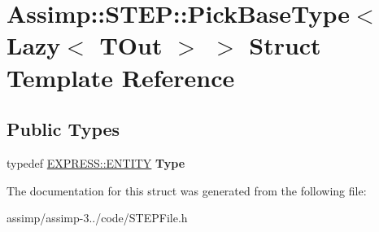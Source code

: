\hypertarget{struct_assimp_1_1_s_t_e_p_1_1_pick_base_type_3_01_lazy_3_01_t_out_01_4_01_4}{\section{Assimp\+:\+:S\+T\+E\+P\+:\+:Pick\+Base\+Type$<$ Lazy$<$ T\+Out $>$ $>$ Struct Template Reference}
\label{struct_assimp_1_1_s_t_e_p_1_1_pick_base_type_3_01_lazy_3_01_t_out_01_4_01_4}
}
\subsection*{Public Types}
\begin{DoxyCompactItemize}
\item 
\hypertarget{struct_assimp_1_1_s_t_e_p_1_1_pick_base_type_3_01_lazy_3_01_t_out_01_4_01_4_a855b8f34c13b1d40784c799609af99dc}{typedef \hyperlink{class_assimp_1_1_s_t_e_p_1_1_e_x_p_r_e_s_s_1_1_e_n_t_i_t_y}{E\+X\+P\+R\+E\+S\+S\+::\+E\+N\+T\+I\+T\+Y} {\bfseries Type}}\label{struct_assimp_1_1_s_t_e_p_1_1_pick_base_type_3_01_lazy_3_01_t_out_01_4_01_4_a855b8f34c13b1d40784c799609af99dc}

\end{DoxyCompactItemize}


The documentation for this struct was generated from the following file\+:\begin{DoxyCompactItemize}
\item 
assimp/assimp-\/3../code/S\+T\+E\+P\+File.\+h\end{DoxyCompactItemize}
